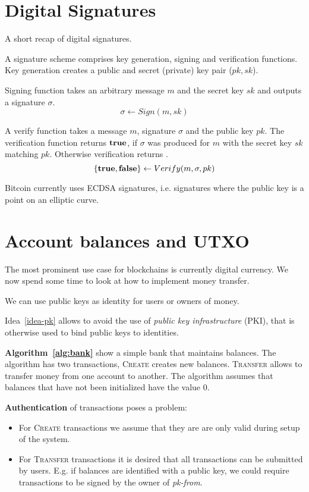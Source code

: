 
\section{Digital Signatures}
A short recap of digital signatures.

A signature scheme comprises key generation, signing and verification functions.
Key generation creates a public and secret (private) key pair ($pk, sk$).

Signing function takes an arbitrary message $m$ and the secret key $sk$ and outputs a signature $\sigma$.
\[
\sigma\leftarrow Sign(m,sk)
\]

A verify function takes a message $m$, signature $\sigma$ and the public key $pk$. The verification function returns $\textbf{true}$, if $\sigma$ was produced for $m$ with the secret key $sk$ matching $pk$. Otherwise verification returns \false.
\[
\{ \textbf{true}, \textbf{false} \} \leftarrow Verify(m,\sigma,pk)
\]

Bitcoin currently uses ECDSA signatures, i.e. signatures where the public key is a point on an elliptic curve.

\section{Account balances and UTXO}
The most prominent use case for blockchains is currently digital currency. 
We now spend some time to look at how to implement money transfer. 


\begin{idea}
	\label{idea-pk}
	We can use public keys as identity for users or owners of money. 
\end{idea}
\begin{note}
Idea~\ref{idea-pk} allows to avoid the use of \emph{public key infrastructure} (PKI), that is otherwise used to bind public keys to identities.
\end{note}

\textbf{Algorithm~\ref{alg:bank}} show a simple bank that maintains balances.
The algorithm has two transactions, \textsc{Create} creates new balances.
\textsc{Transfer} allows to transfer money from one account to another.
The algorithm assumes that balances that have not been initialized have the value 0.


\textbf{Authentication} of transactions poses a problem:
\begin{itemize}
	\item For \textsc{Create} transactions we assume that they are are only valid during setup of the system.
	\item For \textsc{Transfer} transactions it is desired that all transactions can be submitted by users. E.g. if balances are identified with a public key, we could require transactions to be signed by the owner of \textit{pk-from}.
\end{itemize}

